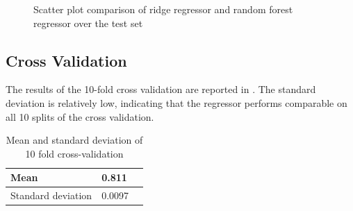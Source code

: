 \documentclass[12pt,a4paper]{scrartcl}
\begin{document}
	\begin{figure}[H]
		\centering	
		\caption{Scatter plot comparison of ridge regressor and random forest regressor over the test set}
		\label{fig:ex1_3_scatter_lin_rf}
	\end{figure}




	\subsection*{Cross Validation}
	
	The results of the 10-fold cross validation are reported in .
	The standard deviation is relatively low, indicating that the regressor performs comparable on all 10 splits of the cross validation.
	
	\begin{table}[H]
		\centering
		\begin{tabular}{|l|l|c|} \hline
			Mean               & 0.811  \\ \hline
			Standard deviation & 0.0097 \\ \hline
		\end{tabular}
		\caption{Mean and standard deviation of 10 fold cross-validation}
		\label{tab:ex1_3_cross_val}
	\end{table}
\end{document}

